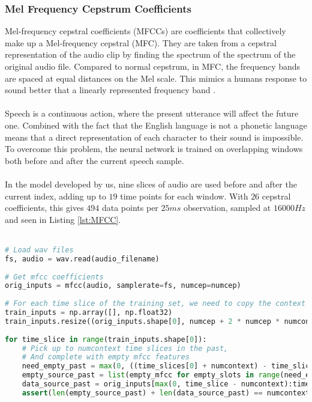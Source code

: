 \subsubsection{Mel Frequency Cepstrum Coefficients}
Mel-frequency cepstral coefficients (MFCCs) are coefficients that collectively make up a Mel-frequency cepstral (MFC). 
They are taken from a cepstral representation of the audio clip by finding the spectrum of the spectrum of the original audio file.
 Compared to normal cepstrum, in MFC, the frequency bands are spaced at equal distances on the Mel scale.
 This mimics a humans response to sound better that a linearly represented frequency band \cite{sahidullah2012design}.\\\\
Speech is a continuous action, where the present utterance will affect the future one. Combined with the fact that the English language is not a phonetic language means that a direct
representation of each character to their sound is impossible. To overcome this problem, the neural network is trained on overlapping windows both before and after the current speech sample.\\\\
In the model developed by us, nine slices of audio are used before and after the current index, adding up to $19$ time points for each window. With $26$ cepstral coefficients, this gives $494$ data points per $25ms$ observation, sampled at $16 000 Hz$ and seen in Listing \ref{lst:MFCC}.\\\

\begin{lstlisting}[language = Python, flexiblecolumns=true, label=lst:MFCC, caption = Example code to obtain MFCC features.]
# Load wav files
fs, audio = wav.read(audio_filename)
 
# Get mfcc coefficients
orig_inputs = mfcc(audio, samplerate=fs, numcep=numcep)
 
# For each time slice of the training set, we need to copy the context this makes
train_inputs = np.array([], np.float32)
train_inputs.resize((orig_inputs.shape[0], numcep + 2 * numcep * numcontext))
 
for time_slice in range(train_inputs.shape[0]):
    # Pick up to numcontext time slices in the past,
    # And complete with empty mfcc features
    need_empty_past = max(0, ((time_slices[0] + numcontext) - time_slice))
    empty_source_past = list(empty_mfcc for empty_slots in range(need_empty_past))
    data_source_past = orig_inputs[max(0, time_slice - numcontext):time_slice]
    assert(len(empty_source_past) + len(data_source_past) == numcontext)
\end{lstlisting}
 
